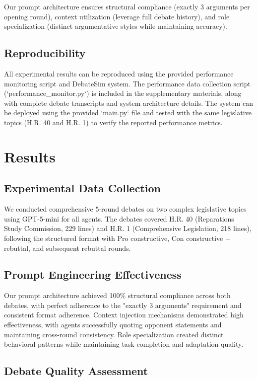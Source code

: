 \documentclass{article}
\begin{document}
Our prompt architecture ensures structural compliance (exactly 3 arguments per opening round), context utilization (leverage full debate history), and role specialization (distinct argumentative styles while maintaining accuracy).

\subsection{Reproducibility}

All experimental results can be reproduced using the provided performance monitoring script and DebateSim system. The performance data collection script (`performance_monitor.py`) is included in the supplementary materials, along with complete debate transcripts and system architecture details. The system can be deployed using the provided `main.py` file and tested with the same legislative topics (H.R. 40 and H.R. 1) to verify the reported performance metrics.

\section{Results}

\subsection{Experimental Data Collection}

We conducted comprehensive 5-round debates on two complex legislative topics using GPT-5-mini for all agents. The debates covered H.R. 40 (Reparations Study Commission, 229 lines) and H.R. 1 (Comprehensive Legislation, 218 lines), following the structured format with Pro constructive, Con constructive + rebuttal, and subsequent rebuttal rounds.

\subsection{Prompt Engineering Effectiveness}

Our prompt architecture achieved 100\% structural compliance across both debates, with perfect adherence to the "exactly 3 arguments" requirement and consistent format adherence. Context injection mechanisms demonstrated high effectiveness, with agents successfully quoting opponent statements and maintaining cross-round consistency. Role specialization created distinct behavioral patterns while maintaining task completion and adaptation quality.

\subsection{Debate Quality Assessment}
\end{document}
